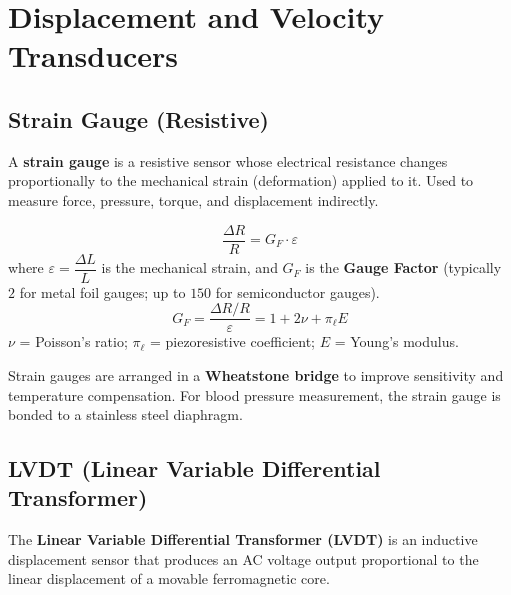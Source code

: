 \documentclass[12pt,a4paper]{article}
\begin{document}
\section{Displacement and Velocity Transducers}

\subsection{Strain Gauge (Resistive)}

\begin{tcolorbox}[defbox, title={\textbf{Strain Gauge}}]
A \textbf{strain gauge} is a resistive sensor whose electrical resistance changes proportionally to the mechanical strain (deformation) applied to it. Used to measure force, pressure, torque, and displacement indirectly.
\end{tcolorbox}

\begin{tcolorbox}[formulabox, title={\textbf{Strain Gauge Formula}}]
\[
\frac{\Delta R}{R} = G_F \cdot \varepsilon
\]
where $\varepsilon = \dfrac{\Delta L}{L}$ is the mechanical strain, and $G_F$ is the \textbf{Gauge Factor} (typically $2$ for metal foil gauges; up to $150$ for semiconductor gauges).
\[
G_F = \frac{\Delta R/R}{\varepsilon} = 1 + 2\nu + \pi_\ell E
\]
$\nu$ = Poisson's ratio; $\pi_\ell$ = piezoresistive coefficient; $E$ = Young's modulus.
\end{tcolorbox}

Strain gauges are arranged in a \textbf{Wheatstone bridge} to improve sensitivity and temperature compensation. For blood pressure measurement, the strain gauge is bonded to a stainless steel diaphragm.

\subsection{LVDT (Linear Variable Differential Transformer)}

\begin{tcolorbox}[defbox, title={\textbf{LVDT}}]
The \textbf{Linear Variable Differential Transformer (LVDT)} is an inductive displacement sensor that produces an AC voltage output proportional to the linear displacement of a movable ferromagnetic core.
\end{tcolorbox}
\end{document}
